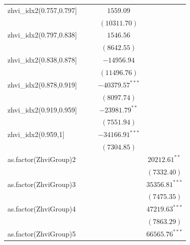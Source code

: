\documentclass[12pt,a4paper]{article}
\begin{document}
\begin{table}[H]
\begin{adjustbox}{width=1\textwidth}
\begin{tabular}{l c c c c}
			zhvi\_idx2(0.757,0.797] &                   &                    & $1559.09$          &                    \\
			&                   &                    & $(10311.70)$       &                    \\
			zhvi\_idx2(0.797,0.838] &                   &                    & $1546.56$          &                    \\
			&                   &                    & $(8642.55)$        &                    \\
			zhvi\_idx2(0.838,0.878] &                   &                    & $-14956.94$        &                    \\
			&                   &                    & $(11496.76)$       &                    \\
			zhvi\_idx2(0.878,0.919] &                   &                    & $-40379.57^{***}$  &                    \\
			&                   &                    & $(8097.74)$        &                    \\
			zhvi\_idx2(0.919,0.959] &                   &                    & $-23981.79^{**}$   &                    \\
			&                   &                    & $(7551.94)$        &                    \\
			zhvi\_idx2(0.959,1]     &                   &                    & $-34166.91^{***}$  &                    \\
			&                   &                    & $(7304.85)$        &                    \\
			as.factor(ZhviGroup)2   &                   &                    &                    & $20212.61^{**}$    \\
			&                   &                    &                    & $(7332.40)$        \\
			as.factor(ZhviGroup)3   &                   &                    &                    & $35356.81^{***}$   \\
			&                   &                    &                    & $(7475.35)$        \\
			as.factor(ZhviGroup)4   &                   &                    &                    & $47219.63^{***}$   \\
			&                   &                    &                    & $(7863.29)$        \\
			as.factor(ZhviGroup)5   &                   &                    &                    & $66565.76^{***}$   \\

\end{tabular}
\end{adjustbox}
\end{table}
\end{document}
